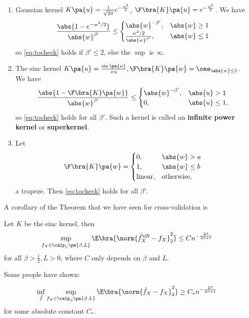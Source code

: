 \begin{example}\label{exa:fourier_kernel}
\begin{enumerate}
  \item Gaussian kernel $K\pa{u} = \frac{1}{\sqrt{2\pi}} e^{-\frac{u^2}{2}}$, $\F\bra{K}\pa{u} = e^{-\frac{u^2}{2}}$. We have
  \begin{equation}
    \frac{\abs{1-e^{-w^2 /2 }}}{\abs{w}^{\beta'}} \leq \begin{cases} \abs{w}^{-\beta'}, &\abs{w}\geq 1\\
    \frac{w^2/2}{\abs{w}^{\beta'}}, &\abs{w}\leq 1 \end{cases}
  \end{equation}
  so \cref{eq:tocheck} holds if $\beta'\leq 2$, else the $\sup$ is $\infty$.
  \item The sinc kernel $K\pa{u} = \frac{\sin\pa{u}}{\pi u}, \F\bra{K}\pa{w}= \one_{\abs{w}\leq 1}$. We have
  \begin{equation}
    \frac{\abs{1- \F\bra{K}\pa{w}}}{\abs{w}^{\beta'}} \leq \begin{cases}
      \abs{w}^{-\beta'}, & \abs{u}> 1\\
      0, & \abs{u}\leq 1,
    \end{cases}
  \end{equation}
  so \cref{eq:tocheck} holds for all $\beta'$. Such a kernel is called an \textbf{infinite power kernel} or \textbf{superkernel}.
  \item Let \begin{equation}
  \F\bra{K}\pa{w} = \begin{cases}
    0, & \abs{w} >a\\
    1, & \abs{w}\leq b \\
    \text{linear}, &\text{otherwise},
  \end{cases}
  \end{equation}
  a trapeze. Then \cref{eq:tocheck} holds for all $\beta'$.
\end{enumerate}
\end{example}
A corollary of the Theorem that we have seen for cross-validation is
\begin{corollary}
  Let $K$ be the sinc kernel, then
  \begin{equation}
    \sup_{f_X\in \calp_S\pa{\beta,L}}\E\bra{\norm{\hat{f}_X^{\CV} - f_X}_2^2 }\leq Cn^{-\frac{2\beta}{2\beta +1}}
  \end{equation}
  for all $\beta > \frac{1}{2}, L>0$, where $C$ only depends on $\beta$ and $L$.
\end{corollary}
Some people have shown:
\begin{proposition}
  \begin{equation}
    \inf_{\hat{f}}\sup_{f_X\in \calp_S\pa{\beta,L}}\E\bra{\norm{\hat{f}_X - f_X}^2_2}\geq C_\ast n^{-\frac{2\beta}{2\beta +1}}
  \end{equation}
  for some absolute constant $C_\ast$.
\end{proposition}

